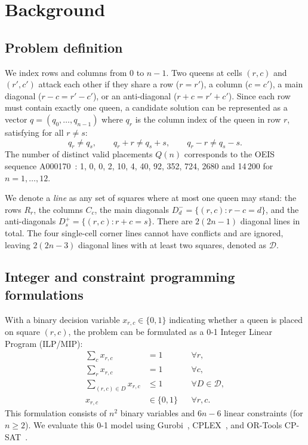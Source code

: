 \documentclass[a4paper,fleqn]{cas-sc}
\begin{document}
\section{Background}\label{sec:background}

\subsection{Problem definition}

We index rows and columns from $0$ to $n-1$. Two queens at cells $(r,c)$ and $(r',c')$ attack each other if they share a row ($r=r'$), a column ($c=c'$), a main diagonal ($r-c=r'-c'$), or an anti-diagonal ($r+c=r'+c'$). Since each row must contain exactly one queen, a candidate solution can be represented as a vector $q=(q_0,\dots,q_{n-1})$ where $q_r$ is the column index of the queen in row $r$, satisfying for all $r\ne s$:
\begin{equation}\label{eq:perm}
q_r \neq q_s, \qquad q_r + r \neq q_s + s, \qquad q_r - r \neq q_s - s .
\end{equation}
The number of distinct valid placements $Q(n)$ corresponds to the OEIS sequence A000170~\citep{oeisA000170}: 1, 0, 0, 2, 10, 4, 40, 92, 352, 724, 2680 and 14\,200 for $n=1,\dots,12$.

We denote a \emph{line} as any set of squares where at most one queen may stand: the rows $R_r$, the columns $C_c$, the main diagonals $D^-_d=\{(r,c): r-c=d\}$, and the anti-diagonals $D^+_s=\{(r,c): r+c=s\}$. There are $2(2n-1)$ diagonal lines in total. The four single-cell corner lines cannot have conflicts and are ignored, leaving $2(2n-3)$ diagonal lines with at least two squares, denoted as $\mathcal{D}$.

\subsection{Integer and constraint programming formulations}

With a binary decision variable $x_{r,c} \in \{0, 1\}$ indicating whether a queen is placed on square $(r,c)$, the problem can be formulated as a 0-1 Integer Linear Program (ILP/MIP):
\begin{align}
\textstyle\sum_{c} x_{r,c} &= 1 && \forall r, \label{eq:ilp-row}\\
\textstyle\sum_{r} x_{r,c} &= 1 && \forall c, \label{eq:ilp-col}\\
\textstyle\sum_{(r,c)\in D} x_{r,c} &\le 1 && \forall D\in\mathcal{D}, \label{eq:ilp-diag}\\
x_{r,c} &\in\{0,1\} && \forall r,c. \label{eq:ilp-bin}
\end{align}
This formulation consists of $n^2$ binary variables and $6n-6$ linear constraints (for $n\ge2$). We evaluate this 0-1 model using Gurobi~\citep{gurobi2025}, CPLEX~\citep{cplex2022}, and OR-Tools CP-SAT~\citep{perron2026cpsat}.
\end{document}
